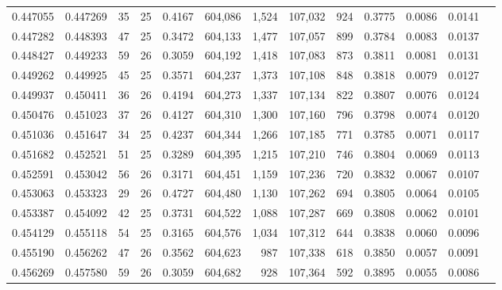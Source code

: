 \begin{tabular}{rrrrrrrrrrrrr}
0.447055 & 0.447269 &    35 &  25 &                                     0.4167 & 604,086 &   1,524 & 107,032 &     924 & 0.3775 & 0.0086 & 0.0141 \\
0.447282 & 0.448393 &    47 &  25 &                                     0.3472 & 604,133 &   1,477 & 107,057 &     899 & 0.3784 & 0.0083 & 0.0137 \\
0.448427 & 0.449233 &    59 &  26 &                                     0.3059 & 604,192 &   1,418 & 107,083 &     873 & 0.3811 & 0.0081 & 0.0131 \\
0.449262 & 0.449925 &    45 &  25 &                                     0.3571 & 604,237 &   1,373 & 107,108 &     848 & 0.3818 & 0.0079 & 0.0127 \\
0.449937 & 0.450411 &    36 &  26 &                                     0.4194 & 604,273 &   1,337 & 107,134 &     822 & 0.3807 & 0.0076 & 0.0124 \\
0.450476 & 0.451023 &    37 &  26 &                                     0.4127 & 604,310 &   1,300 & 107,160 &     796 & 0.3798 & 0.0074 & 0.0120 \\
0.451036 & 0.451647 &    34 &  25 &                                     0.4237 & 604,344 &   1,266 & 107,185 &     771 & 0.3785 & 0.0071 & 0.0117 \\
0.451682 & 0.452521 &    51 &  25 &                                     0.3289 & 604,395 &   1,215 & 107,210 &     746 & 0.3804 & 0.0069 & 0.0113 \\
0.452591 & 0.453042 &    56 &  26 &                                     0.3171 & 604,451 &   1,159 & 107,236 &     720 & 0.3832 & 0.0067 & 0.0107 \\
0.453063 & 0.453323 &    29 &  26 &                                     0.4727 & 604,480 &   1,130 & 107,262 &     694 & 0.3805 & 0.0064 & 0.0105 \\
0.453387 & 0.454092 &    42 &  25 &                                     0.3731 & 604,522 &   1,088 & 107,287 &     669 & 0.3808 & 0.0062 & 0.0101 \\
0.454129 & 0.455118 &    54 &  25 &                                     0.3165 & 604,576 &   1,034 & 107,312 &     644 & 0.3838 & 0.0060 & 0.0096 \\
0.455190 & 0.456262 &    47 &  26 &                                     0.3562 & 604,623 &     987 & 107,338 &     618 & 0.3850 & 0.0057 & 0.0091 \\
0.456269 & 0.457580 &    59 &  26 &                                     0.3059 & 604,682 &     928 & 107,364 &     592 & 0.3895 & 0.0055 & 0.0086 \\

\end{tabular}
